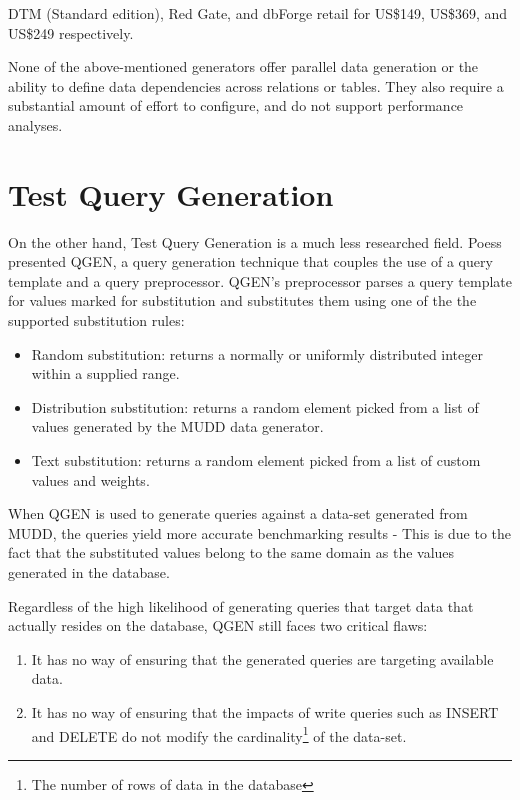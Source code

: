 \documentclass[12pt]{report}
\begin{document}
\begin{spacing}{1.9}
		DTM (Standard edition), Red Gate, and dbForge retail for US\$149, US\$369, and US\$249 respectively. 
		
		None of the above-mentioned generators offer parallel data generation or the ability to define data dependencies across relations or tables. They also require a substantial amount of effort to configure, and do not support performance analyses. 
		
		\section{Test Query Generation}
		On the other hand, Test Query Generation is a much less researched field. Poess\cite{Poess:2004} presented QGEN, a query generation technique that couples the use of a query template and a query preprocessor. QGEN's preprocessor parses a query template for values marked for substitution and substitutes them using one of the the supported substitution rules:
		
		\begin{itemize}
			\item Random substitution: returns a normally or uniformly distributed integer within a supplied range.
			\item Distribution substitution: returns a random element picked from a list of values generated by the MUDD data generator\cite{Stephens:2004}. 
			\item Text substitution: returns a random element picked from a list of custom values and weights.
		\end{itemize}
		
		
		When QGEN is used to generate queries against a data-set generated from MUDD, the queries yield more accurate benchmarking results - This is due to the fact that the substituted values belong to the same domain as the values generated in the database. 
		
		Regardless of the high likelihood of generating queries that target data that actually resides on the database, QGEN still faces two critical flaws:
		\begin{enumerate}
			\item It has no way of ensuring that the generated queries are targeting available data.
			\item It has no way of ensuring that the impacts of write queries such as INSERT and DELETE do not modify the cardinality\footnote{The number of rows of data in the database} of the data-set.
		\end{enumerate}
		

\end{spacing}
\end{document}
